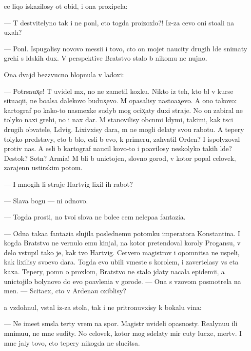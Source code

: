 \documentclass[10pt]{book}
\begin{document}
{\Y}ee liqo iskazilosy ot obid{\yi}, i ona proxipela:

— T{\yi} de{\y}stvitelyno tak i ne pon{\ia}l, cto togda pro{\y}izoxlo?! Iz-za cevo oni sto{\y}ali na uxah?

— Pon{\ia}l. Ispugalisy novovo messi{\y}i i tovo, cto on mojet naucity drugih l{\iu}de{\y} snimaty grehi s l{\iu}dskih dux. V perspektive Bratstvo stalo b{\yi} nikomu ne nujno.

Ona dvajd{\yi} bezzvucno hlopnula v ladoxi:

— Potr{\ia}sa{\y}ux̨e! T{\yi} uvidel m{\yi}x, no ne zametil koxku. Nikto iz teh, kto b{\yi}l v kurse situaqi{\y}i, ne bo{\y}alsa dalekovo budux̨evo. M{\yi} opasalisy nasto{\y}ax̨evo. A ono takovo: kartograf po kako{\y}-to nasmexke sudyb{\yi} mog ocix̨aty duxi straje{\y}. No on zabiral ne tolyko naxi grehi, no i nax dar. M{\yi} stanovilisy ob{\yi}cn{\yi}mi l{\iu}dymi, takimi, kak t{\yi}s{\ia}ci drugih ob{\yi}vatele{\y}, L{\iu}dvig. Lixivxisy dara, m{\yi} ne mogli delaty svo{\y}u rabotu. A tepery tolyko predstavy, cto b{\yi} b{\yi}lo, {\y}esli b{\yi} {\y}evo, k primeru, zahvatil Orden? I ispolyzoval protiv nas. A {\y}esli b{\yi} kartograf naucil kovo-to i po{\y}avilosy neskolyko takih l{\iu}de{\y}? Des{\ia}tok? Sotn{\ia}? Armi{\y}a! M{\yi} b{\yi}li b{\yi} unictojen{\yi}, slovno gorod, v kotor{\yi}{\y} popal celovek, zarajenn{\yi}{\y} {\y}ustirskim potom.

— I mnogih li straje{\y} Hartvig lixil ih rabot{\yi}?

— Slava bogu — ni odnovo.

— Togda prosti, no tvo{\y}i slova ne bole{\y}e cem nelepa{\y}a fantazi{\y}a.

— Odna taka{\y}a fantazi{\y}a slujila poslednemu potomku imperatora Konstantina. I kogda Bratstvo ne vernulo {\y}emu kinjal, na kotor{\yi}{\y} pretendoval koroly Progansu, v delo vstupil tako{\y} je, kak tvo{\y} Hartvig. Cetvero magistrov i opomnitsa ne uspeli, kak lixilisy svo{\y}evo dara. Togda {\y}evo ubili vmeste s korolem, i zavertelasy vs{\ia} eta kaxa. Tepery, pomn{\ia} o proxlom, Bratstvo ne stalo jdaty nacala epidemi{\y}i, a unictojilo bolynovo do {\y}evo po{\y}avleni{\y}a v gorode. — Ona s v{\yi}zovom posmotrela na men{\ia}. — Scita{\y}ex, cto v Ardenau oxiblisy?

{\Y}a vzdohnul, vstal iz-za stola, tak i ne pritronuvxisy k bokalu vina:

— Ne ime{\y}et sm{\yi}sla ter{\ia}ty vrem{\ia} na spor{\yi}. Magistr{\yi} uvideli opasnosty. Realynu{\y}u ili mnimu{\y}u, ne mne sudity. No celovek, kotor{\yi}{\y} mog sdelaty mir cuty lucxe, mertv. I mne jaly tovo, cto tepery nikogda ne slucitsa.
\end{document}
